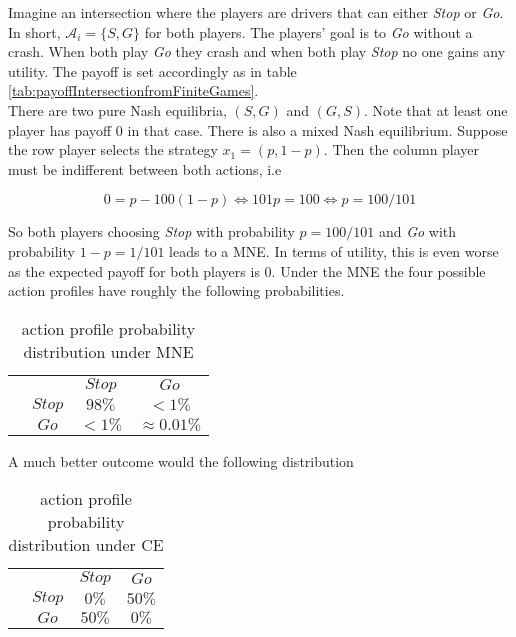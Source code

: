 Imagine an intersection where the players are drivers that can either \textit{Stop} or \textit{Go}. In short, $\mathcal{A}_i = \{S,G\}$ for both players. The players' goal is to \textit{Go} without a crash. When both play \textit{Go} they crash and when both play \textit{Stop} no one gains any utility. The payoff is set accordingly as in table \ref{tab:payoffIntersectionfromFiniteGames}. \\

There are two pure Nash equilibria, $(S,G)$ and $(G,S)$. Note that at least one player has payoff $0$ in that case. There is also a mixed Nash equilibrium. Suppose the row player selects the strategy $x_1 = (p,1-p)$. Then the column player must be indifferent between both actions, i.e 

\begin{equation*}
    0 = p - 100(1-p) \iff 101p = 100 \iff p = 100/101
\end{equation*}

So both players choosing \textit{Stop} with probability $p = 100/101$ and \textit{Go} with probability $1-p = 1/101$  leads to a MNE. In terms of utility, this is even worse as the expected payoff for both players is $0$. Under the MNE the four possible action
profiles have roughly the following probabilities. 

\begin{table}[H]\centering
\setlength{\extrarowheight}{2pt}
\begin{tabular}{cc|c|c|}
  & \multicolumn{1}{c}{} & \multicolumn{1}{c}{$Stop$}  & \multicolumn{1}{c}{$Go$} \\\cline{3-4}
  & $Stop$ & $98\%$ & $<1\%$ \\\cline{3-4}
  & $Go$ & $<1\%$ & $\approx 0.01\%$ \\\cline{3-4}
\end{tabular}\caption{\label{tab:probabilityUnderMNE}action profile probability distribution under MNE}
\end{table}

A much better outcome would the following distribution

\begin{table}[H]\centering
\setlength{\extrarowheight}{2pt}
\begin{tabular}{cc|c|c|}
  & \multicolumn{1}{c}{} & \multicolumn{1}{c}{$Stop$}  & \multicolumn{1}{c}{$Go$} \\\cline{3-4}
  & $Stop$ & $0\%$ & $50\%$ \\\cline{3-4}
  & $Go$ & $50\%$ & $0\%$ \\\cline{3-4}
\end{tabular}\caption{\label{tab:probabilityUnderCE}action profile probability distribution under CE}
\end{table}

